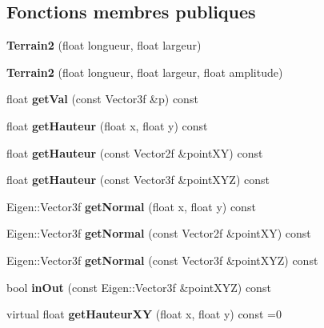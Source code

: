 \subsection*{Fonctions membres publiques}
\begin{DoxyCompactItemize}
\item 
\hypertarget{class_terrain2_a2245d074c7751192570314dd36bfab51}{}{\bfseries Terrain2} (float longueur, float largeur)\label{class_terrain2_a2245d074c7751192570314dd36bfab51}

\item 
\hypertarget{class_terrain2_a30320ba13d807f3d5ee9e544ff28a573}{}{\bfseries Terrain2} (float longueur, float largeur, float amplitude)\label{class_terrain2_a30320ba13d807f3d5ee9e544ff28a573}

\item 
\hypertarget{class_terrain2_af818a4981ae70d88f228eeec1d11fcdc}{}float {\bfseries get\+Val} (const Vector3f \&p) const \label{class_terrain2_af818a4981ae70d88f228eeec1d11fcdc}

\item 
\hypertarget{class_terrain2_a459909a83424a200d4e8b53c2dd0b041}{}float {\bfseries get\+Hauteur} (float x, float y) const \label{class_terrain2_a459909a83424a200d4e8b53c2dd0b041}

\item 
\hypertarget{class_terrain2_ae57264c2e7b0c0bb5f1d45790ffe4805}{}float {\bfseries get\+Hauteur} (const Vector2f \&point\+X\+Y) const \label{class_terrain2_ae57264c2e7b0c0bb5f1d45790ffe4805}

\item 
\hypertarget{class_terrain2_a7a6f7c1087f28d73f701eda95e0a507a}{}float {\bfseries get\+Hauteur} (const Vector3f \&point\+X\+Y\+Z) const \label{class_terrain2_a7a6f7c1087f28d73f701eda95e0a507a}

\item 
\hypertarget{class_terrain2_aea130dd744bf1cb3088049830e276703}{}Eigen\+::\+Vector3f {\bfseries get\+Normal} (float x, float y) const \label{class_terrain2_aea130dd744bf1cb3088049830e276703}

\item 
\hypertarget{class_terrain2_abf87449fe785634f4db20a479c94646f}{}Eigen\+::\+Vector3f {\bfseries get\+Normal} (const Vector2f \&point\+X\+Y) const \label{class_terrain2_abf87449fe785634f4db20a479c94646f}

\item 
\hypertarget{class_terrain2_a282a1eacd89a624387aef33b3d4aed81}{}Eigen\+::\+Vector3f {\bfseries get\+Normal} (const Vector3f \&point\+X\+Y\+Z) const \label{class_terrain2_a282a1eacd89a624387aef33b3d4aed81}

\item 
\hypertarget{class_terrain2_a7e3f99ed0a703720da6e529ef7c15a94}{}bool {\bfseries in\+Out} (const Eigen\+::\+Vector3f \&point\+X\+Y\+Z) const \label{class_terrain2_a7e3f99ed0a703720da6e529ef7c15a94}

\item 
\hypertarget{class_terrain2_a333e74d757bfcc2d4eb7ec75d082f5a7}{}virtual float {\bfseries get\+Hauteur\+X\+Y} (float x, float y) const  =0\label{class_terrain2_a333e74d757bfcc2d4eb7ec75d082f5a7}

\end{DoxyCompactItemize}
